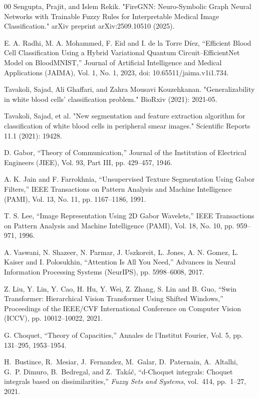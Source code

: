 \documentclass[preprint,12pt]{elsarticle}
\begin{document}
\begin{thebibliography}{00}
Sengupta, Prajit, and Islem Rekik. "FireGNN: Neuro-Symbolic Graph Neural Networks with Trainable Fuzzy Rules for Interpretable Medical Image Classification." arXiv preprint arXiv:2509.10510 (2025).

E. A. Radhi, M. A. Mohammed, F. Eid and I. de la Torre Díez,
``Efficient Blood Cell Classification Using a Hybrid Variational Quantum Circuit–EfficientNet Model on BloodMNIST,''
Journal of Artificial Intelligence and Medical Applications (JAIMA),
Vol. 1, No. 1, 2023, doi: 10.65511/jaima.v1i1.734.

Tavakoli, Sajad, Ali Ghaffari, and Zahra Mousavi Kouzehkanan. "Generalizability in white blood cells’ classification problem." BioRxiv (2021): 2021-05.

Tavakoli, Sajad, et al. "New segmentation and feature extraction algorithm for classification of white blood cells in peripheral smear images." Scientific Reports 11.1 (2021): 19428.

D. Gabor,
``Theory of Communication,''
Journal of the Institution of Electrical Engineers (JIEE), Vol. 93, Part III, pp. 429--457, 1946.

A. K. Jain and F. Farrokhnia,
``Unsupervised Texture Segmentation Using Gabor Filters,''
IEEE Transactions on Pattern Analysis and Machine Intelligence (PAMI),
Vol. 13, No. 11, pp. 1167--1186, 1991.

T. S. Lee,
``Image Representation Using 2D Gabor Wavelets,''
IEEE Transactions on Pattern Analysis and Machine Intelligence (PAMI),
Vol. 18, No. 10, pp. 959--971, 1996.

A. Vaswani, N. Shazeer, N. Parmar, J. Uszkoreit, L. Jones, A. N. Gomez, 
L. Kaiser and I. Polosukhin,
``Attention Is All You Need,''
Advances in Neural Information Processing Systems (NeurIPS),
pp. 5998--6008, 2017.

Z. Liu, Y. Lin, Y. Cao, H. Hu, Y. Wei, Z. Zhang, S. Lin and B. Guo,
``Swin Transformer: Hierarchical Vision Transformer Using Shifted Windows,''
Proceedings of the IEEE/CVF International Conference on Computer Vision (ICCV),
pp. 10012--10022, 2021.

G. Choquet,
``Theory of Capacities,''
Annales de l’Institut Fourier,
Vol. 5, pp. 131--295, 1953--1954.

H.~Bustince, R.~Mesiar, J.~Fernandez, M.~Galar, D.~Paternain, A.~Altalhi, G.~P. Dimuro, B.~Bedregal, and Z.~Takáč,
``d-Choquet integrals: Choquet integrals based on dissimilarities,''
\emph{Fuzzy Sets and Systems}, vol.~414, pp.~1--27, 2021.


\end{thebibliography}
\end{document}
